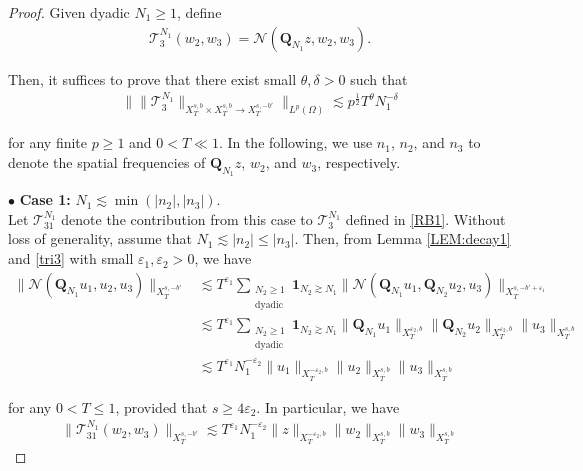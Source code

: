 \documentclass[%
11pt,  reqno]{amsart}
\newcommand{\1}{\hspace{0.2mm}\text{I}\hspace{0.2mm}}
\newcommand{\noi}{\noindent}
\newcommand{\Q}{\mathbf{Q}}
\newcommand{\dl}{\delta}
\newcommand{\eps}{\varepsilon}
\newcommand{\ta}{\theta}
\renewcommand{\O}{\Omega}
\newcommand{\les}{\lesssim}
\newcommand{\ges}{\gtrsim}
\newcommand{\ind}{\mathbf 1}
\newcommand{\NN}{\mathcal{N}}
\numberwithin{equation}{section}
\numberwithin{theorem}{section}
\newcommand{\TT}{\mathcal{T}}
\begin{document}
\begin{proof}
Given dyadic $N_1 \ge 1$, define
\begin{align}
\TT_3^{N_1} (w_2, w_3) =  \NN(\Q_{N_1} z, w_2, w_3).
\label{RB1}
\end{align}



\noi
Then, it suffices to prove that 
there exist 
 small $\ta, \dl > 0$ such that 
\begin{align}
\Big\| \| \TT_3^{N_1} 
\|_{X^{s,b}_T\times X^{s,b}_T  \to X^{s,-b'}_T} 
\Big\|_{L^p (\O)} 
\les p^\frac 12   T^\ta N_1^{-\dl} 
\label{RB2}
\end{align}

\noi
for any finite $p \ge 1$ and $0 < T\ll 1$.
In the following, we use $n_1$, $n_2$, and $n_3$
to denote
the spatial frequencies of $\Q_{N_1} z$, $w_2$, and $w_3$, 
respectively.




\medskip

\noi 
$\bullet$ {\bf Case 1:}
$N_1   \les \min(|n_2|, |n_3|)$.
\\
\indent
Let $\TT_{31}^{N_1}$ denote the contribution
from this case 
to $\TT_{3}^{N_1}$ defined in \eqref{RB1}.
Without loss of generality, assume that 
$N_1\les |n_2| \le |n_3|$.
Then, 
from Lemma \ref{LEM:decay1} and \eqref{tri3} 
with small $\eps_1, \eps_2 > 0$, we have 
\begin{align*}
\big\|
\NN( \Q_{N_1}  u_1, u_2,   u_3)\big\|_{X^{s, - b' }_T} 
& \les 
T^{\eps_1}
\sum_{\substack{N_2 \ge 1\\\text{dyadic}}}
\ind_{N_2 \ges N_1}
\big\|
\NN( \Q_{N_1} u_1, \Q_{N_2}u_2,   u_3)\big\|_{X^{s, - b'+\eps_1 }_T} \\
& 
\les 
T^{\eps_1}
\sum_{\substack{N_2 \ge 1\\\text{dyadic}}}
\ind_{N_2 \ges N_1}
 \|\Q_{N_1}u_1\|_{X^{\eps_2, b }_T}
  \|\Q_{N_2}u_2\|_{X^{\eps_2, b }_T}
\|u_3\|_{X^{s, b}_T}\\
& 
\les T^{\eps_1} 
N_1^{-\eps_2}
\|u_1\|_{X^{- \eps_2, b }_T}
  \|u_2\|_{X^{s, b }_T}
\|u_3\|_{X^{s, b}_T}
\end{align*}

\noi
for any  $0 < T \le 1$, 
provided that $s \ge  4\eps_2$.
In particular, we have 
\begin{align*}
\|\TT_{31}^{N_1}(w_2, w_3)\|_{X^{s, - b'}_T}
\les T^{\eps_1} 
N_1^{-\eps_2}
 \| z\|_{X^{-\eps_2, b }_T}
\|w_2\|_{X^{s, b}_T}
\|w_3\|_{X^{s, b}_T}
\end{align*}



\end{proof}
\end{document}
